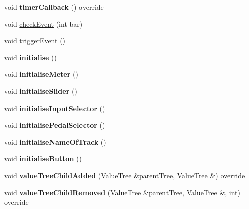 \begin{DoxyCompactItemize}
\item 
\mbox{\label{class_track_acf4e21647334887f49c16d9ec155b725}} 
void {\bfseries timer\+Callback} () override
\item 
void \mbox{\hyperlink{class_track_afc1af9074d7a5c729b787e35fef2ba8b}{check\+Event}} (int bar)
\item 
void \mbox{\hyperlink{class_track_aeae974f2aacaf6f9139a2cfc12a67e8e}{trigger\+Event}} ()
\item 
\mbox{\label{class_track_ad29545ea4a067d785b94fedfb82d6339}} 
void {\bfseries initialise} ()
\item 
\mbox{\label{class_track_afe70b23f590240b40413c73d655e4d9a}} 
void {\bfseries initialise\+Meter} ()
\item 
\mbox{\label{class_track_a29f8cb781832a8202642875a5108de24}} 
void {\bfseries initialise\+Slider} ()
\item 
\mbox{\label{class_track_a1a897cea72c5e71db87421cef4c7d0ce}} 
void {\bfseries initialise\+Input\+Selector} ()
\item 
\mbox{\label{class_track_a00ef1300dc459d5106e72ec819f72a7f}} 
void {\bfseries initialise\+Pedal\+Selector} ()
\item 
\mbox{\label{class_track_ae997925e085f959980da24b6245b94cc}} 
void {\bfseries initialise\+Name\+Of\+Track} ()
\item 
\mbox{\label{class_track_aac881f87a120244d2a0f3486f0493e0b}} 
void {\bfseries initialise\+Button} ()
\item 
\mbox{\label{class_track_a1721072991932b92d775bfcefbea17db}} 
void {\bfseries value\+Tree\+Child\+Added} (Value\+Tree \&parent\+Tree, Value\+Tree \&) override
\item 
\mbox{\label{class_track_a35dfa1c3211d03014466f038f1b596d4}} 
void {\bfseries value\+Tree\+Child\+Removed} (Value\+Tree \&parent\+Tree, Value\+Tree \&, int) override
\item 
\mbox{\label{class_track_a750139df1ead2f5d7fde5ad467af07ca}} 

\end{DoxyCompactItemize}
